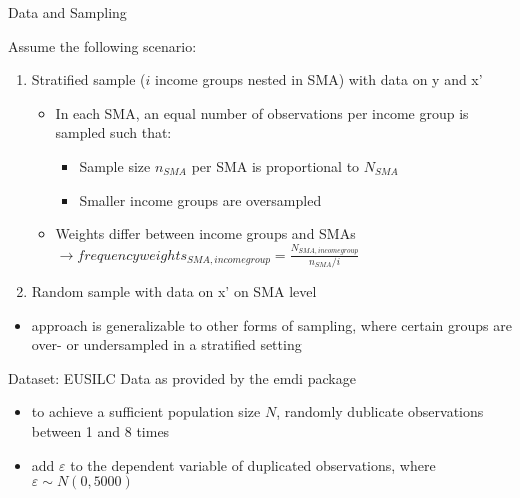    
\begin{column}{.3\linewidth}

 \begin{block}{Data and Sampling \Pheight}

Assume the following scenario: 
\begin{enumerate}
\item Stratified sample ($i$ income groups nested in SMA) with data on y and x'
\begin{itemize}
\item In each SMA, an equal number of observations per income group is sampled such that:
\begin{itemize}
\item Sample size $n_{SMA}$ per SMA is proportional to  $N_{SMA}$ 
\item Smaller income groups are oversampled
\end{itemize}
\item Weights differ between income groups and SMAs
$\rightarrow frequency weights_{SMA, income group} = {\frac {N_{SMA,income group}} {n_{SMA}/i}} $
\end{itemize}
\item Random sample with data on x' on SMA level

\end{enumerate}

\begin{itemize}
\item approach is generalizable to other forms of sampling, where certain groups are over- or undersampled in a stratified setting
\end{itemize} 

 Dataset: EUSILC Data as provided by the emdi package
\begin{itemize}

\item to achieve a sufficient population size $N$, randomly dublicate observations between 1 and 8 times
\item add $\varepsilon$ to the dependent variable of duplicated observations, where  $\varepsilon \sim N(0,5000)$
\end{itemize} 

\end{block}
\end{column}     




